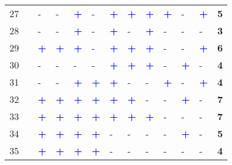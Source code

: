 \begin{longtable}{p{0.5cm}p{4.6cm}p{0.3cm}p{0.3cm}p{0.3cm}p{0.3cm}p{0.3cm}p{0.3cm}p{0.3cm}p{0.3cm}p{0.3cm}p{0.3cm}p{1cm}}
    \small{27} & \small{\textcite{cervero_bike-and-ride_2013}}\index{Cervero, Robert|pagebf} & - & - & \textcolor{blue}{\textbf{+}} & - & \textcolor{blue}{\textbf{+}} & \textcolor{blue}{\textbf{+}} & \textcolor{blue}{\textbf{+}} & \textcolor{blue}{\textbf{+}} & - & \textcolor{blue}{\textbf{+}} & \textbf{5}\\
    \small{28} & \small{\textcite{cervero_influences_2009}}\index{Cervero, Robert|pagebf} & - & - & \textcolor{blue}{\textbf{+}} & - & \textcolor{blue}{\textbf{+}} & - & \textcolor{blue}{\textbf{+}} & - & - & - & \textbf{3}\\
    \small{29} & \small{\textcite{chan_factors_2020}}\index{Chan, Kevin|pagebf} & \textcolor{blue}{\textbf{+}} & \textcolor{blue}{\textbf{+}} & \textcolor{blue}{\textbf{+}} & - & \textcolor{blue}{\textbf{+}} & \textcolor{blue}{\textbf{+}} & \textcolor{blue}{\textbf{+}} & - & - & \textcolor{blue}{\textbf{+}} & \textbf{6}\\
    \small{30} & \small{\textcite{chen_determinants_2012}}\index{Chen, Lijun|pagebf} & - & - & - & - & \textcolor{blue}{\textbf{+}} & \textcolor{blue}{\textbf{+}} & \textcolor{blue}{\textbf{+}} & - & \textcolor{blue}{\textbf{+}} & - & \textbf{4}\\ 
    \small{31} & \small{\textcite{chen_study_2013}}\index{Chen, Wan|pagebf} & - & - & \textcolor{blue}{\textbf{+}} & \textcolor{blue}{\textbf{+}} & \textcolor{blue}{\textbf{+}} & - & - & \textcolor{blue}{\textbf{+}} & - & \textcolor{blue}{\textbf{+}} & \textbf{4}\\
    \small{32} & \small{\textcite{chen_what_2022}}\index{Chen, Wendong|pagebf} & \textcolor{blue}{\textbf{+}} & \textcolor{blue}{\textbf{+}} & \textcolor{blue}{\textbf{+}} & \textcolor{blue}{\textbf{+}} & \textcolor{blue}{\textbf{+}} & \textcolor{blue}{\textbf{+}} & - & - & \textcolor{blue}{\textbf{+}} & - & \textbf{7}\\
    \small{33} & \small{\textcite{cheng_comparison_2023}}\index{Cheng, Long|pagebf} & \textcolor{blue}{\textbf{+}} & \textcolor{blue}{\textbf{+}} & \textcolor{blue}{\textbf{+}} & \textcolor{blue}{\textbf{+}} & \textcolor{blue}{\textbf{+}} & \textcolor{blue}{\textbf{+}} & \textcolor{blue}{\textbf{+}} & - & - & - & \textbf{7}\\
    \small{34} & \small{\textcite{cheng_promoting_2022}} & \textcolor{blue}{\textbf{+}} & \textcolor{blue}{\textbf{+}} & \textcolor{blue}{\textbf{+}} & \textcolor{blue}{\textbf{+}} & - & - & - & - & \textcolor{blue}{\textbf{+}} & - & \textbf{5}\\
    \small{35} & \small{\textcite{chen_exploring_2022}} & \textcolor{blue}{\textbf{+}} & \textcolor{blue}{\textbf{+}} & \textcolor{blue}{\textbf{+}} & \textcolor{blue}{\textbf{+}} & - & - & - & - & - & - & \textbf{4}\\

\end{longtable}
